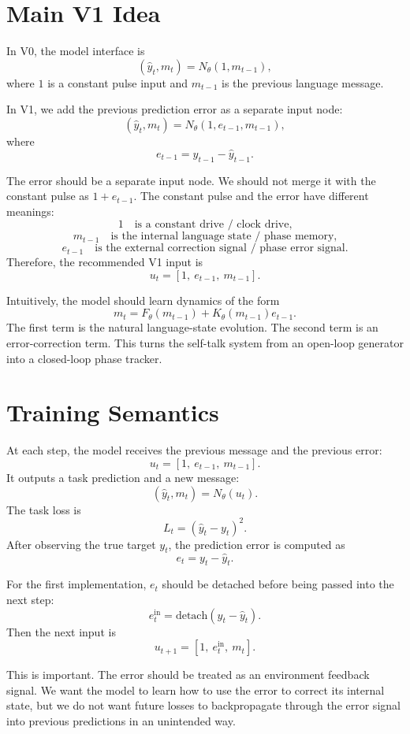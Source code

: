 \documentclass[11pt]{article}
\begin{document}
\section{Main V1 Idea}

In V0, the model interface is
\[
(\hat y_t, m_t) = N_\theta(1, m_{t-1}),
\]
where $1$ is a constant pulse input and $m_{t-1}$ is the previous language message.

In V1, we add the previous prediction error as a separate input node:
\[
(\hat y_t, m_t) = N_\theta(1, e_{t-1}, m_{t-1}),
\]
where
\[
e_{t-1} = y_{t-1} - \hat y_{t-1}.
\]

The error should be a separate input node. We should not merge it with the constant pulse as $1+e_{t-1}$. The constant pulse and the error have different meanings:
\[
1
\quad\text{is a constant drive / clock drive,}
\]
\[
m_{t-1}
\quad\text{is the internal language state / phase memory,}
\]
\[
e_{t-1}
\quad\text{is the external correction signal / phase error signal.}
\]
Therefore, the recommended V1 input is
\[
u_t = [1,\ e_{t-1},\ m_{t-1}].
\]

Intuitively, the model should learn dynamics of the form
\[
m_t = F_\theta(m_{t-1}) + K_\theta(m_{t-1}) e_{t-1}.
\]
The first term is the natural language-state evolution. The second term is an error-correction term. This turns the self-talk system from an open-loop generator into a closed-loop phase tracker.

\section{Training Semantics}

At each step, the model receives the previous message and the previous error:
\[
u_t = [1,\ e_{t-1},\ m_{t-1}].
\]
It outputs a task prediction and a new message:
\[
(\hat y_t, m_t) = N_\theta(u_t).
\]
The task loss is
\[
L_t = (\hat y_t - y_t)^2.
\]
After observing the true target $y_t$, the prediction error is computed as
\[
e_t = y_t - \hat y_t.
\]

For the first implementation, $e_t$ should be detached before being passed into the next step:
\[
e_t^{\mathrm{in}} = \mathrm{detach}(y_t - \hat y_t).
\]
Then the next input is
\[
u_{t+1} = [1,\ e_t^{\mathrm{in}},\ m_t].
\]

This is important. The error should be treated as an environment feedback signal. We want the model to learn how to use the error to correct its internal state, but we do not want future losses to backpropagate through the error signal into previous predictions in an unintended way.
\end{document}
